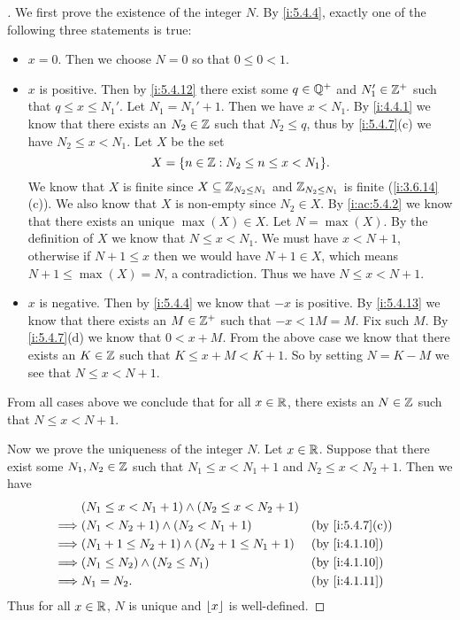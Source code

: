 \begin{proof}[]
  We first prove the existence of the integer \(N\).
  By \cref{i:5.4.4}, exactly one of the following three statements is true:
  \begin{itemize}
    \item \(x = 0\).
          Then we choose \(N = 0\) so that \(0 \leq 0 < 1\).
    \item \(x\) is positive.
          Then by \cref{i:5.4.12} there exist some \(q \in \mathbb{Q}^+\) and \(N_1' \in \mathbb{Z}^+\) such that \(q \leq x \leq N_1'\).
          Let \(N_1 = N_1' + 1\).
          Then we have \(x < N_1\).
          By \cref{i:4.4.1} we know that there exists an \(N_2 \in \mathbb{Z}\) such that \(N_2 \leq q\), thus by \cref{i:5.4.7}(c) we have \(N_2 \leq x < N_1\).
          Let \(X\) be the set
          \[
            X = \set{n \in \Z : N_2 \leq n \leq x < N_1}.
          \]
          We know that \(X\) is finite since \(X \subseteq \mathbb{Z}_{N_2 \leq N_1}\) and \(\mathbb{Z}_{N_2 \leq N_1}\) is finite (\cref{i:3.6.14}(c)).
          We also know that \(X\) is non-empty since \(N_2 \in X\).
          By \cref{i:ac:5.4.2} we know that there exists an unique \(\max(X) \in X\).
          Let \(N = \max(X)\).
          By the definition of \(X\) we know that \(N \leq x < N_1\).
          We must have \(x < N + 1\), otherwise if \(N + 1 \leq x\) then we would have \(N + 1 \in X\), which means \(N + 1 \leq \max(X) = N\), a contradiction.
          Thus we have \(N \leq x < N + 1\).
    \item \(x\) is negative.
          Then by \cref{i:5.4.4} we know that \(-x\) is positive.
          By \cref{i:5.4.13} we know that there exists an \(M \in \mathbb{Z}^+\) such that \(-x < 1M = M\).
          Fix such \(M\).
          By \cref{i:5.4.7}(d) we know that \(0 < x + M\).
          From the above case we know that there exists an \(K \in \mathbb{Z}\) such that \(K \leq x + M < K + 1\).
          So by setting \(N = K - M\) we see that \(N \leq x < N + 1\).
  \end{itemize}
  From all cases above we conclude that for all \(x \in \mathbb{R}\), there exists an \(N \in \mathbb{Z}\) such that \(N \leq x < N + 1\).

  Now we prove the uniqueness of the integer \(N\).
  Let \(x \in \mathbb{R}\).
  Suppose that there exist some \(N_1, N_2 \in \mathbb{Z}\) such that \(N_1 \leq x < N_1 + 1\) and \(N_2 \leq x < N_2 + 1\).
  Then we have
  \begin{align*}
             & (N_1 \leq x < N_1 + 1) \land (N_2 \leq x < N_2 + 1)                      \\
    \implies & (N_1 < N_2 + 1) \land (N_2 < N_1 + 1)               &  & \by{i:5.4.7}[c] \\
    \implies & (N_1 + 1 \leq N_2 + 1) \land (N_2 + 1 \leq N_1 + 1) &  & \by{i:4.1.10}   \\
    \implies & (N_1 \leq N_2) \land (N_2 \leq N_1)                 &  & \by{i:4.1.10}   \\
    \implies & N_1 = N_2.                                          &  & \by{i:4.1.11}
  \end{align*}
  Thus for all \(x \in \mathbb{R}\), \(N\) is unique and \(\left\lfloor x\right\rfloor\) is well-defined.
\end{proof}


